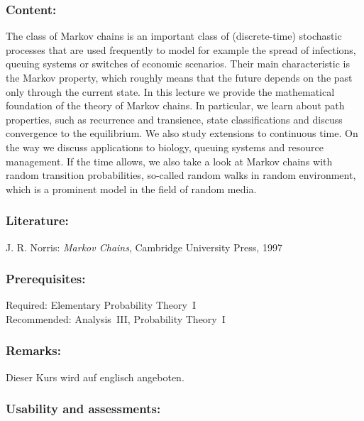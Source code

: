 \documentclass[a4paper,10pt]{article}
\begin{document}
\subsubsection*{\large
    Content:
}
The class of Markov chains is an important class of (discrete-time) stochastic processes that are used frequently to model for example the spread of infections, queuing systems or switches of economic scenarios. Their main characteristic is the Markov property, which roughly means that the future depends on the past only through the current state. In this lecture we provide the mathematical foundation of the theory of Markov chains. In particular, we learn about path properties, such as recurrence and transience, state classifications and discuss convergence to the equilibrium. We also study extensions to continuous time. On the way we discuss applications to biology, queuing systems and resource management. If the time allows, we also take a look at Markov chains with random transition probabilities, so-called random walks in random environment, which is a prominent model in the field of random media. 

\subsubsection*{\large
    Literature:
}
J. R. Norris: \emph{Markov Chains}, Cambridge University Press, 1997
\subsubsection*{\large
    Prerequisites:
}
Required: Elementary Probability Theory~I \\ Recommended: Analysis~III,  Probability Theory~I
\subsubsection*{\large
    Remarks:
}
Dieser Kurs wird auf englisch angeboten.
\cleardoublepage
\subsubsection*{\large
    Usability and assessments:
}
\end{document}
